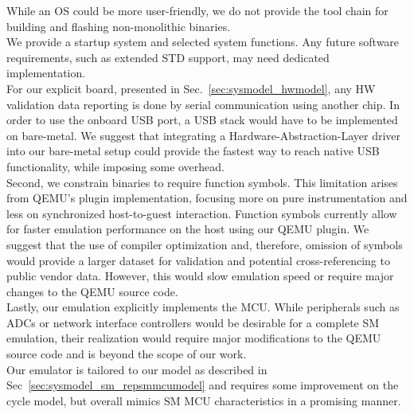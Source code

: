 \documentclass[english]{tudscrartcl}
\begin{document}
			While an \ac{OS} could be more user-friendly, we do not provide the tool chain for building and flashing non-monolithic binaries.
			\\
			We provide a startup system and selected system functions.
			Any future software requirements, such as extended \ac{STD} support, may need dedicated implementation.
			\\
			For our explicit board, presented in Sec.~\ref{sec:sysmodel_hwmodel}, any \ac{HW} validation data reporting is done by serial communication using another chip.
			In order to use the onboard USB port, a USB stack would have to be implemented on bare-metal.
			We suggest that integrating a Hardware-Abstraction-Layer driver into our bare-metal setup could provide the fastest way to reach native USB functionality, while imposing some overhead.
			\\
			Second, we constrain binaries to require function symbols.
			This limitation arises from QEMU's plugin implementation, focusing more on pure instrumentation and less on synchronized host-to-guest interaction.
			Function symbols currently allow for faster emulation performance on the host using our QEMU plugin.
			We suggest that the use of compiler optimization and, therefore, omission of symbols would provide a larger dataset for validation and potential cross-referencing to public vendor data.
			However, this would slow emulation speed or require major changes to the QEMU source code.
			\\
			Lastly, our emulation explicitly implements the \ac{MCU}.
			While peripherals such as \acp{ADC} or network interface controllers would be desirable for a complete \ac{SM} emulation, their realization would require major modifications to the QEMU source code and is beyond the scope of our work.
			\\
			Our emulator is tailored to our model as described in Sec~\ref{sec:sysmodel_sm_repsmmcumodel} and requires some improvement on the cycle model, but overall mimics \ac{SM} \ac{MCU} characteristics in a promising manner.
\end{document}
